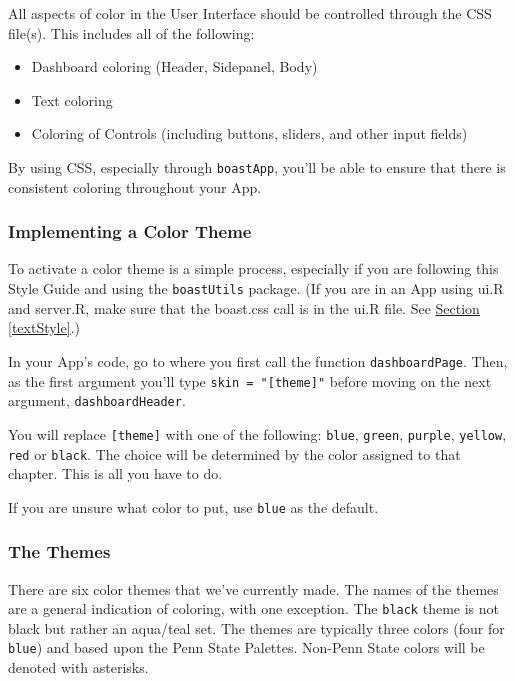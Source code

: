 \documentclass[
]{book}
\providecommand{\tightlist}{%
  \setlength{\itemsep}{0pt}\setlength{\parskip}{0pt}}
\begin{document}
All aspects of color in the User Interface should be controlled through the CSS file(s). This includes all of the following:

\begin{itemize}
\tightlist
\item
  Dashboard coloring (Header, Sidepanel, Body)
\item
  Text coloring
\item
  Coloring of Controls (including buttons, sliders, and other input fields)
\end{itemize}

By using CSS, especially through \texttt{boastApp}, you'll be able to ensure that there is consistent coloring throughout your App.

\hypertarget{implementing-a-color-theme}{%
\subsubsection{Implementing a Color Theme}\label{implementing-a-color-theme}}

To activate a color theme is a simple process, especially if you are following this Style Guide and using the \texttt{boastUtils} package. (If you are in an App using ui.R and server.R, make sure that the boast.css call is in the ui.R file. See \protect\hyperlink{textStyle}{Section \ref{textStyle}}.)

In your App's code, go to where you first call the function \texttt{dashboardPage}. Then, as the first argument you'll type \texttt{skin\ =\ "{[}theme{]}"} before moving on the next argument, \texttt{dashboardHeader}.

You will replace \texttt{{[}theme{]}} with one of the following: \texttt{blue}, \texttt{green}, \texttt{purple}, \texttt{yellow}, \texttt{red} or \texttt{black}. The choice will be determined by the color assigned to that chapter. This is all you have to do.

If you are unsure what color to put, use \texttt{blue} as the default.

\hypertarget{the-themes}{%
\subsubsection{The Themes}\label{the-themes}}

There are six color themes that we've currently made. The names of the themes are a general indication of coloring, with one exception. The \texttt{black} theme is not black but rather an aqua/teal set. The themes are typically three colors (four for \texttt{blue}) and based upon the Penn State Palettes. Non-Penn State colors will be denoted with asterisks.
\end{document}
